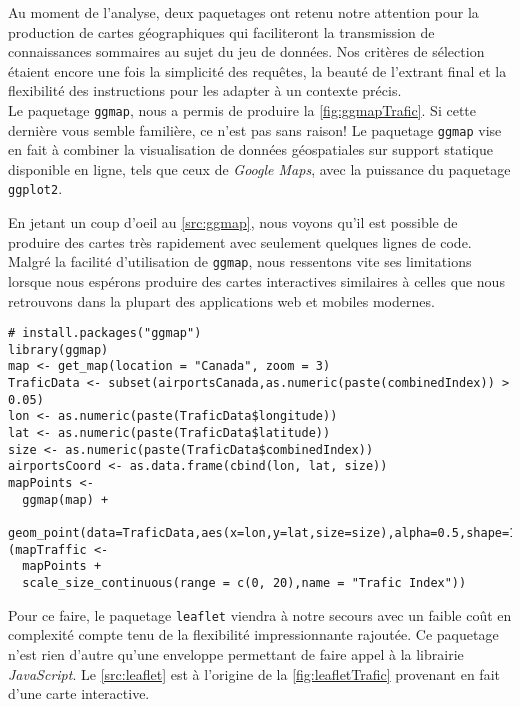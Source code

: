 Au moment de l'analyse, deux paquetages ont retenu notre attention pour la production de cartes géographiques qui faciliteront la transmission de connaissances sommaires au sujet du jeu de données. Nos critères de sélection étaient encore une fois la simplicité des requêtes, la beauté de l'extrant final et la flexibilité des instructions pour les adapter à un contexte précis. \\

Le paquetage \texttt{ggmap}, nous a permis de produire la \autoref{fig:ggmapTrafic}. Si cette dernière vous semble familière, ce n'est pas sans raison! Le paquetage \texttt{ggmap} vise en fait à combiner la visualisation de données géospatiales sur support statique disponible en ligne, tels que ceux de \emph{Google Maps}, avec la puissance du paquetage \texttt{ggplot2}. \cite{Rpackage:ggmap} \\


En jetant un coup d'oeil au \autoref{src:ggmap}, nous voyons qu'il est possible de produire des cartes très rapidement avec seulement quelques lignes de code. Malgré la facilité d'utilisation de \texttt{ggmap}, nous ressentons vite ses limitations lorsque nous espérons produire des cartes interactives similaires à celles que nous retrouvons dans la plupart des applications web et mobiles modernes. \\

\begin{lstlisting}[caption = Générer une carte du trafic aérien avec \texttt{ggmap},label=src:ggmap]
# install.packages("ggmap")
library(ggmap)
map <- get_map(location = "Canada", zoom = 3)
TraficData <- subset(airportsCanada,as.numeric(paste(combinedIndex)) > 0.05)
lon <- as.numeric(paste(TraficData$longitude))
lat <- as.numeric(paste(TraficData$latitude))
size <- as.numeric(paste(TraficData$combinedIndex))
airportsCoord <- as.data.frame(cbind(lon, lat, size))
mapPoints <- 
  ggmap(map) + 
  geom_point(data=TraficData,aes(x=lon,y=lat,size=size),alpha=0.5,shape=16)
(mapTraffic <-  
  mapPoints + 
  scale_size_continuous(range = c(0, 20),name = "Trafic Index"))
\end{lstlisting}

\vspace{\baselineskip}
Pour ce faire, le paquetage \texttt{leaflet} \cite{leaflet} viendra à notre secours avec un faible coût en complexité compte tenu de la flexibilité impressionnante rajoutée. Ce paquetage n'est rien d'autre qu'une enveloppe permettant de faire appel à la librairie \emph{JavaScript}. \cite{leafletjs} Le \autoref{src:leaflet} est à l'origine de la \autoref{fig:leafletTrafic} provenant en fait d'une carte interactive. \\

